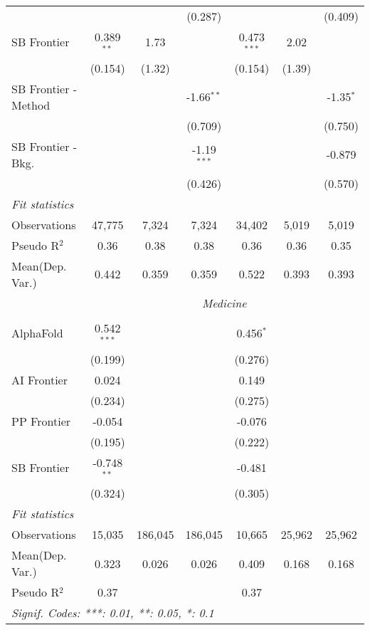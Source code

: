 \begin{tabular}{lcccccc}
                        &               &              & (0.287)       &               &         & (0.409)\\   
   SB Frontier          & 0.389$^{**}$  & 1.73         &               & 0.473$^{***}$ & 2.02    &   \\   
                        & (0.154)       & (1.32)       &               & (0.154)       & (1.39)  &   \\   
   SB Frontier - Method &               &              & -1.66$^{**}$  &               &         & -1.35$^{*}$\\   
                        &               &              & (0.709)       &               &         & (0.750)\\   
   SB Frontier - Bkg.   &               &              & -1.19$^{***}$ &               &         & -0.879\\   
                        &               &              & (0.426)       &               &         & (0.570)\\   
   \midrule
   \emph{Fit statistics}\\
   Observations         & 47,775        & 7,324        & 7,324         & 34,402        & 5,019   & 5,019\\  
   Pseudo R$^2$         & 0.36          & 0.38         & 0.38          & 0.36          & 0.36    & 0.35\\  
   
Mean(Dep. Var.) & 0.442 & 0.359 & 0.359 & 0.522 & 0.393 & 0.393 \\
 & \multicolumn{6}{c}{\textit{Medicine}} \\ \\
   AlphaFold    & 0.542$^{***}$ &         &         & 0.456$^{*}$ &        &   \\   
                & (0.199)       &         &         & (0.276)     &        &   \\   
   AI Frontier  & 0.024         &         &         & 0.149       &        &   \\   
                & (0.234)       &         &         & (0.275)     &        &   \\   
   PP Frontier  & -0.054        &         &         & -0.076      &        &   \\   
                & (0.195)       &         &         & (0.222)     &        &   \\   
   SB Frontier  & -0.748$^{**}$ &         &         & -0.481      &        &   \\   
                & (0.324)       &         &         & (0.305)     &        &   \\   
   \midrule
   \emph{Fit statistics}\\
   Observations & 15,035        & 186,045 & 186,045 & 10,665      & 25,962 & 25,962\\  
Mean(Dep. Var.) & 0.323 & 0.026 & 0.026 & 0.409 & 0.168 & 0.168 \\
   Pseudo R$^2$ & 0.37          &         &         & 0.37        &        & \\  
   \midrule \midrule
   \multicolumn{7}{l}{\emph{Signif. Codes: ***: 0.01, **: 0.05, *: 0.1}}\\
\end{tabular}
\par\endgroup
